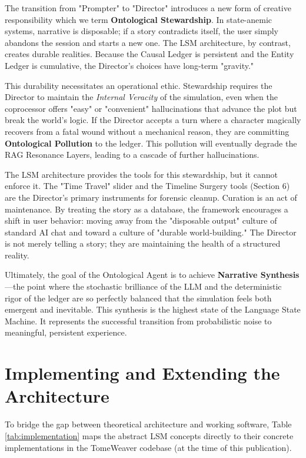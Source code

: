 \documentclass[12pt, a4paper]{article}
\begin{document}
The transition from "Prompter" to "Director" introduces a new form of creative responsibility which we term \textbf{Ontological Stewardship}. In state-anemic systems, narrative is disposable; if a story contradicts itself, the user simply abandons the session and starts a new one. The LSM architecture, by contrast, creates durable realities. Because the Causal Ledger is persistent and the Entity Ledger is cumulative, the Director’s choices have long-term "gravity." 

This durability necessitates an operational ethic. Stewardship requires the Director to maintain the \textit{Internal Veracity} of the simulation, even when the coprocessor offers "easy" or "convenient" hallucinations that advance the plot but break the world's logic. If the Director accepts a turn where a character magically recovers from a fatal wound without a mechanical reason, they are committing \textbf{Ontological Pollution} to the ledger. This pollution will eventually degrade the RAG Resonance Layers, leading to a cascade of further hallucinations.

The LSM architecture provides the tools for this stewardship, but it cannot enforce it. The "Time Travel" slider and the Timeline Surgery tools (Section 6) are the Director’s primary instruments for forensic cleanup. Curation is an act of maintenance. By treating the story as a database, the framework encourages a shift in user behavior: moving away from the "disposable output" culture of standard AI chat and toward a culture of "durable world-building." The Director is not merely telling a story; they are maintaining the health of a structured reality.

Ultimately, the goal of the Ontological Agent is to achieve \textbf{Narrative Synthesis}---the point where the stochastic brilliance of the LLM and the deterministic rigor of the ledger are so perfectly balanced that the simulation feels both emergent and inevitable. This synthesis is the highest state of the Language State Machine. It represents the successful transition from probabilistic noise to meaningful, persistent experience.


\newpage
\section{Implementing and Extending the Architecture}
\label{sec:implement}

To bridge the gap between theoretical architecture and working software, Table \ref{tab:implementation} maps the abstract LSM concepts directly to their concrete implementations in the TomeWeaver codebase (at the time of this publication). 
\end{document}
